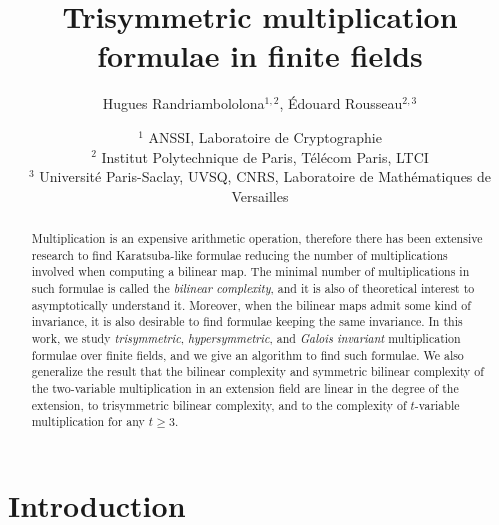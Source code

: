 \documentclass[11pt]{article}
\title{Trisymmetric multiplication formulae in finite fields}
\author{Hugues Randriambololona$^{1, 2}$, Édouard Rousseau$^{2, 3}$}
\date{$^1$ ANSSI, Laboratoire de Cryptographie\\
      $^2$ Institut Polytechnique de Paris, Télécom Paris, LTCI\\
      $^3$ Université Paris-Saclay, UVSQ, CNRS, Laboratoire de Mathématiques de Versailles}
\begin{document}
\maketitle

\begin{abstract}
  Multiplication is an expensive arithmetic operation, therefore there has been
  extensive research to find Karatsuba-like formulae reducing the number of
  multiplications involved when computing a bilinear map. The minimal number of
  multiplications in such formulae is called the \emph{bilinear complexity}, and
  it is also of theoretical interest to asymptotically understand it. Moreover,
  when the bilinear maps admit some kind of invariance, it is also desirable to
  find formulae keeping the same invariance. In this work, we study
  \emph{trisymmetric}, \emph{hypersymmetric}, and \emph{Galois invariant} multiplication formulae over finite fields,
   and we give an algorithm to find such formulae.
  We also generalize the result that the bilinear complexity and symmetric bilinear complexity
  of the
  two-variable multiplication in an extension field are linear in the degree of
  the extension, to trisymmetric bilinear complexity, and to the complexity of $t$-variable
  multiplication for any $t\geq3$.
\end{abstract}


\section{Introduction}
\label{sec:intro}
\end{document}
